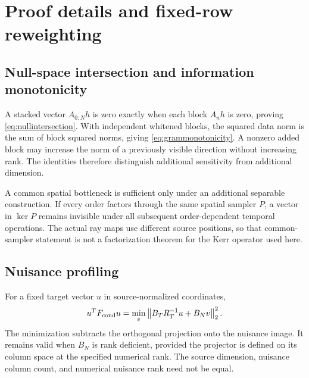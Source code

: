 \section{Proof details and fixed-row reweighting}\label{app:reweight}
\subsection{Null-space intersection and information monotonicity}
A stacked vector $A_{0:N}h$ is zero exactly when each block $A_nh$ is zero, proving \eqref{eq:nullintersection}. With independent whitened blocks, the squared data norm is the sum of block squared norms, giving \eqref{eq:grammonotonicity}. A nonzero added block may increase the norm of a previously visible direction without increasing rank. The identities therefore distinguish additional sensitivity from additional dimension.

A common spatial bottleneck is sufficient only under an additional separable construction. If every order factors through the same spatial sampler $P$, a vector in $\ker P$ remains invisible under all subsequent order-dependent temporal operations. The actual ray maps use different source positions, so that common-sampler statement is not a factorization theorem for the Kerr operator used here.

\subsection{Nuisance profiling}
For a fixed target vector $u$ in source-normalized coordinates,
\begin{equation}
u^TF_{\rm cond}u=\min_v\left\lVert B_TR_T^{-1}u+B_Nv\right\rVert_2^2.
\label{eq:minnuisance}
\end{equation}
The minimization subtracts the orthogonal projection onto the nuisance image. It remains valid when $B_N$ is rank deficient, provided the projector is defined on its column space at the specified numerical rank. The source dimension, nuisance column count, and numerical nuisance rank need not be equal.

